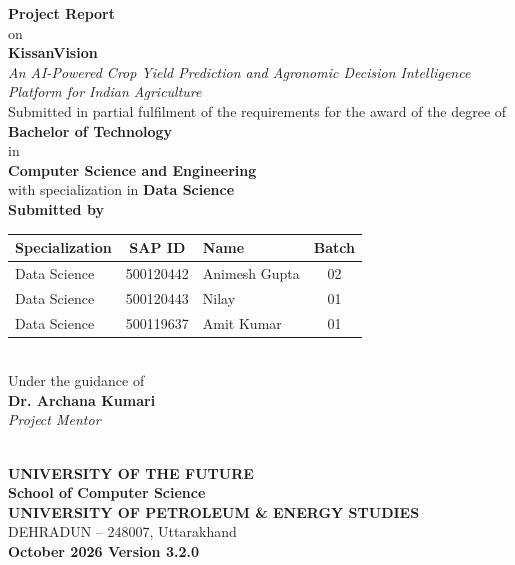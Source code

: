 \documentclass[11pt,a4paper]{report}
\begin{document}
\begin{titlepage}
\centering
\vspace*{5mm}

{\Large \textbf{Project Report}}\\[3mm]
{\normalsize on}\\[6mm]

{\Huge \textbf{KissanVision}}\\[4mm]
{\Large \textit{An AI-Powered Crop Yield Prediction and Agronomic Decision Intelligence Platform for Indian Agriculture}}\\[10mm]

{\normalsize Submitted in partial fulfilment of the requirements for the award of the degree of}\\[3mm]
{\Large \textbf{Bachelor of Technology}}\\[2mm]
{\normalsize in}\\[2mm]
{\large \textbf{Computer Science and Engineering}}\\[1mm]
{\normalsize with specialization in \textbf{Data Science}}\\[10mm]

\textbf{Submitted by}\\[4mm]
\begin{tabular}{|l|c|l|c|}
\hline
\textbf{Specialization} & \textbf{SAP ID} & \textbf{Name} & \textbf{Batch} \\
\hline
Data Science & 500120442 & Animesh Gupta & 02 \\
Data Science & 500120443 & Nilay & 01 \\
Data Science & 500119637 & Amit Kumar & 01 \\
\hline
\end{tabular}\\[10mm]

{\normalsize Under the guidance of}\\[2mm]
{\large \textbf{Dr. Archana Kumari}}\\[1mm]
{\normalsize \textit{Project Mentor}}\\[10mm]

\\[2mm]
{\footnotesize \textbf{UNIVERSITY OF THE FUTURE}}\\[4mm]

{\normalsize \textbf{School of Computer Science}}\\[1mm]
{\large \textbf{UNIVERSITY OF PETROLEUM \& ENERGY STUDIES}}\\[1mm]
{\normalsize DEHRADUN -- 248007, Uttarakhand}\\[6mm]

{\large \textbf{October 2026 \quad\textbar\quad Version 3.2.0}}

\end{titlepage}
\end{document}
